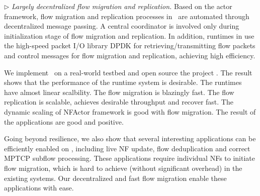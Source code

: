 

$\triangleright$ {\em Largely decentralized flow migration and replication.} Based on the actor framework, flow migration and replication processes in \nfactor~are automated through decentralized message passing. A central coordinator is involved only during initialization stage of flow migration and replication. %
 In addition, runtimes in \nfactor use the high-speed packet I/O library DPDK \cite{dpdk} for retrieving/transmitting flow packets and control messages for flow migration and replication, achieving high efficiency.


We implement \nfactor~on a real-world testbed and open source the project \cite{projectcode}.
 The result shows that the performance of the runtime system is desirable. The runtimes have almost linear scalbility. The flow migration is blazingly fast. The flow replication is scalable, achieves desirable throughput and recover fast. The dynamic scaling of NFActor framework is good with flow migration. The result of the applications are good and positive.

Going beyond resilience, we also show that several interesting applications can be efficiently enabled on \nfactor, including live NF update, flow deduplication and correct MPTCP subflow processing. These applications require individual NFs to initiate flow migration, %
which is hard to achieve (without significant overhead) in the existing systems. %
Our decentralized and fast flow migration enable these applications with ease. %

